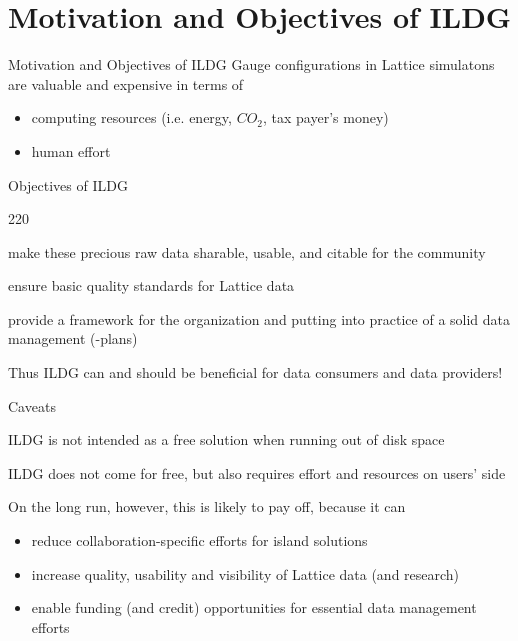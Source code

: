 \documentclass[aspectratio=169,xcolor=dvipsnames]{beamer}
\newcommand{\bi}{\begin{itemize}}
\newcommand{\ei}{\end{itemize}}
\begin{document}
\section{Motivation and Objectives of ILDG}
\begin{frame}{Motivation and Objectives of ILDG}
   Gauge configurations in Lattice simulatons are
   \alert{valuable and expensive} in terms of
   \bi
   \item computing resources (i.e. energy, $CO_2$, tax payer's money)
   \item human effort
   \ei

   \vspace*{5mm}
   \begin{block}{Objectives of ILDG}
   \begin{dinglist}{220}
   \item make these precious raw data sharable, usable, and citable for the community
   \item ensure basic quality standards for Lattice data
   \item provide a framework for the organization and putting into
         practice of a solid data management (-plans)
   \end{dinglist}
   \end{block}

   \vspace*{3mm}
   Thus ILDG can and should be beneficial for data consumers \alert{and} data providers!
   
\end{frame}
\begin{frame}{Caveats}
  
  ILDG is \alert{not} intended as a free solution when running out of disk space

  \vspace*{3mm}
  ILDG does not come for free, but also \alert{requires effort and resources on users' side}

  \vspace*{3mm}
  On the long run, however, this is likely to pay off, because it can
  \begin{block}{}
  \bi
  \item reduce collaboration-specific efforts for island solutions
  \item increase quality, usability and visibility of Lattice data (and research)
  \item enable funding (and credit) opportunities for essential data management efforts
  \ei
  \end{block}
  
\end{frame}
\end{document}
